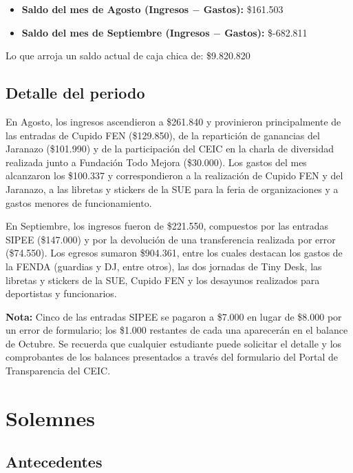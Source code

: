 \documentclass[12pt,letterpaper]{article}
\begin{document}
\begin{itemize}
  \item \textbf{Saldo del mes de Agosto (Ingresos $-$ Gastos):} \$161.503
  \item \textbf{Saldo del mes de Septiembre (Ingresos $-$ Gastos):} \$-682.811
\end{itemize}

Lo que arroja un saldo actual de caja chica de: \$9.820.820

\subsection{Detalle del periodo}

En Agosto, los ingresos ascendieron a \$261.840 y provinieron principalmente de las entradas de Cupido FEN (\$129.850), de la repartición de ganancias del Jaranazo (\$101.990) y de la participación del CEIC en la charla de diversidad realizada junto a Fundación Todo Mejora (\$30.000). Los gastos del mes alcanzaron los \$100.337 y correspondieron a la realización de Cupido FEN y del Jaranazo, a las libretas y stickers de la SUE para la feria de organizaciones y a gastos menores de funcionamiento.

En Septiembre, los ingresos fueron de \$221.550, compuestos por las entradas SIPEE (\$147.000) y por la devolución de una transferencia realizada por error (\$74.550). Los egresos sumaron \$904.361, entre los cuales destacan los gastos de la FENDA (guardias y DJ, entre otros), las dos jornadas de Tiny Desk, las libretas y stickers de la SUE, Cupido FEN y los desayunos realizados para deportistas y funcionarios.

\textbf{Nota:} Cinco de las entradas SIPEE se pagaron a \$7.000 en lugar de \$8.000 por un error de formulario; los \$1.000 restantes de cada una aparecerán en el balance de Octubre. Se recuerda que cualquier estudiante puede solicitar el detalle y los comprobantes de los balances presentados a través del formulario del Portal de Transparencia del CEIC.

\section{Solemnes}

\subsection{Antecedentes}
\end{document}
